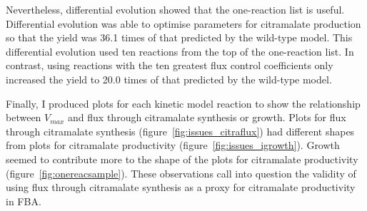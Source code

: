 \documentclass[parskip=full, numbers=noenddot]{scrreprt}
\begin{document}
Nevertheless, differential evolution showed that the one-reaction list is useful.
Differential evolution was able to optimise parameters for citramalate production so that the yield was 36.1 times of that predicted by the wild-type model. This differential evolution used ten reactions from the top of the one-reaction list. In contrast, using reactions with the ten greatest flux control coefficients only increased the yield to 20.0 times of that predicted by the wild-type model.

Finally, I produced plots for each kinetic model reaction to show the relationship between $V_{max}$ and flux through citramalate synthesis or growth.
Plots for flux through citramalate synthesis (figure~\ref{fig:issues_citraflux}) had different shapes from plots for citramalate productivity (figure~\ref{fig:issues_igrowth}). Growth seemed to contribute more to the shape of the plots for citramalate productivity (figure~\ref{fig:onereacsample}). These observations call into question the validity of using flux through citramalate synthesis as a proxy for citramalate productivity in FBA.
\end{document}
